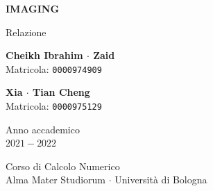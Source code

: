 \documentclass[11pt]{article}
\begin{document}
\graphicspath{ {./img/} }
\begin{titlepage}
    \begin{center}
        \vspace*{1.5cm}
            
        \Huge
        \textbf{IMAGING}
            
        \vspace{0.5cm}
        \LARGE
        Relazione
            
        \vspace{1.5cm}
          
        \begin{minipage}[t]{0.47\textwidth}
        \begin{center}
        	{\large{\bf Cheikh Ibrahim $\cdot$ Zaid}}\\
			{\large Matricola: \texttt{0000974909}}
        \end{center}

		\end{minipage}
		\hfill
		\begin{minipage}[t]{0.47\textwidth}\raggedleft
		\begin{center}
        	{\large{\bf Xia $\cdot$ Tian Cheng}}\\
			{\large Matricola: \texttt{0000975129}}
        \end{center}
		\end{minipage}  
            
        \vspace{6cm}
            
        Anno accademico\\
        $2021 - 2022$
            
        \vspace{0.8cm}
            
            
        \Large
        Corso di Calcolo Numerico\\
        Alma Mater Studiorum $\cdot$ Università di Bologna\\
            
    \end{center}
\end{titlepage}
\pagebreak
\end{document}
